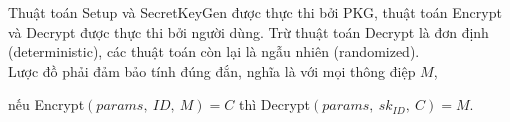 \documentclass[class=report, crop=false]{standalone}
\begin{document}
\begin{definition}[IBE]
			Thuật toán \textsf{Setup} và \textsf{SecretKeyGen} được thực thi bởi PKG, thuật toán \textsf{Encrypt} và \textsf{Decrypt} được thực thi bởi người dùng. Trừ thuật toán \textsf{Decrypt} là đơn định (deterministic), các thuật toán còn lại là ngẫu nhiên (randomized). \\ \indent
			Lược đồ phải đảm bảo tính đúng đắn, nghĩa là với mọi thông điệp $M$,
			\vspace{-\baselineskip}
			\begin{center}
				nếu \hspace{1ex} \textsf{Encrypt}$(params,\ ID,\ M) = C$ \hspace{1ex} thì \hspace{1ex} \textsf{Decrypt}$(params,\ sk_{ID},\ C) = M$.
			\end{center}
		\end{definition}
		\newpage
\end{document}
